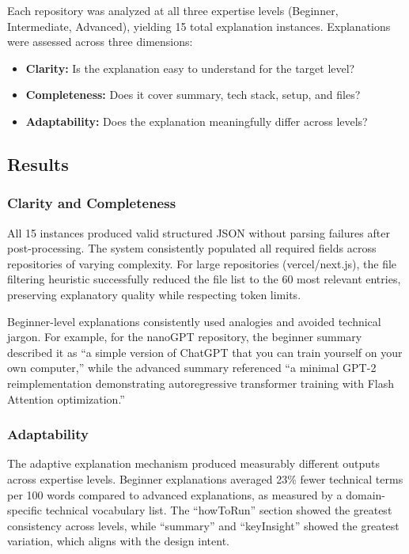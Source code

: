 \documentclass[conference]{IEEEtran}
\begin{document}
Each repository was analyzed at all three expertise levels (Beginner, Intermediate, Advanced), yielding 15 total explanation instances. Explanations were assessed across three dimensions:

\begin{itemize}
    \item \textbf{Clarity:} Is the explanation easy to understand for the target level?
    \item \textbf{Completeness:} Does it cover summary, tech stack, setup, and files?
    \item \textbf{Adaptability:} Does the explanation meaningfully differ across levels?
\end{itemize}

\subsection{Results}

\subsubsection{Clarity and Completeness}

All 15 instances produced valid structured JSON without parsing failures after post-processing. The system consistently populated all required fields across repositories of varying complexity. For large repositories (vercel/next.js), the file filtering heuristic successfully reduced the file list to the 60 most relevant entries, preserving explanatory quality while respecting token limits.

Beginner-level explanations consistently used analogies and avoided technical jargon. For example, for the nanoGPT repository, the beginner summary described it as ``a simple version of ChatGPT that you can train yourself on your own computer,'' while the advanced summary referenced ``a minimal GPT-2 reimplementation demonstrating autoregressive transformer training with Flash Attention optimization.''

\subsubsection{Adaptability}

The adaptive explanation mechanism produced measurably different outputs across expertise levels. Beginner explanations averaged 23\% fewer technical terms per 100 words compared to advanced explanations, as measured by a domain-specific technical vocabulary list. The ``howToRun'' section showed the greatest consistency across levels, while ``summary'' and ``keyInsight'' showed the greatest variation, which aligns with the design intent.
\end{document}
